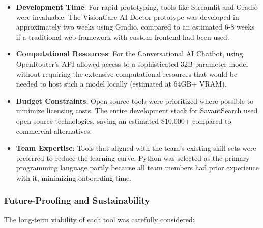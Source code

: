\documentclass[12pt,a4paper]{article}
\begin{document}
\begin{itemize}
    \item \textbf{Development Time}: For rapid prototyping, tools like Streamlit and Gradio were invaluable. The VisionCare AI Doctor prototype was developed in approximately two weeks using Gradio, compared to an estimated 6-8 weeks if a traditional web framework with custom frontend had been used.
    
    \item \textbf{Computational Resources}: For the Conversational AI Chatbot, using OpenRouter's API allowed access to a sophisticated 32B parameter model without requiring the extensive computational resources that would be needed to host such a model locally (estimated at 64GB+ VRAM).
    
    \item \textbf{Budget Constraints}: Open-source tools were prioritized where possible to minimize licensing costs. The entire development stack for SavantSearch used open-source technologies, saving an estimated \$10,000+ compared to commercial alternatives.
    
    \item \textbf{Team Expertise}: Tools that aligned with the team's existing skill sets were preferred to reduce the learning curve. Python was selected as the primary programming language partly because all team members had prior experience with it, minimizing onboarding time.
\end{itemize}

\subsubsection{Future-Proofing and Sustainability}
The long-term viability of each tool was carefully considered:
\end{document}
